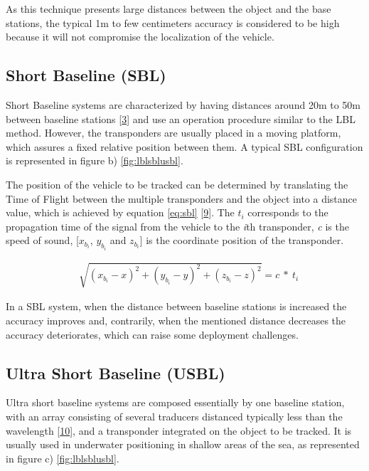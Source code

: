 As this technique presents large distances between the object and the base stations, the typical 1m to few centimeters accuracy is considered to be high because it will not compromise the localization of the vehicle. 


\subsection{Short Baseline (SBL)}

Short Baseline systems are characterized by having distances around 20m to 50m between baseline stations [\hyperref[r:survey-tech-chall]{3}] and use an operation procedure similar to the LBL method. However, the transponders are usually placed in a moving platform, which assures a fixed relative position between them. A typical SBL configuration is represented in figure b) \ref{fig:lblsblusbl}.

The position of the vehicle to be tracked can be determined by translating the Time of Flight between the multiple transponders and the object into a distance value, which is achieved by equation \ref{eq:sbl} [\hyperref[r:sbl]{9}]. The $t_{i}$ corresponds to the propagation time of the signal from the vehicle to the \textit{i}th transponder, \textit{c} is the speed of sound, [$x_{b_{i}}$, $y_{b_{i}}$ and $z_{b_{i}}$] is the coordinate position of the transponder.

\begin{eqnarray}
&\sqrt{ (x_{b_{i}}-x)^2 + (y_{b_{i}}-y)^2 + (z_{b_{i}}-z)^2 } = c\ *\ t_{i}
\label{eq:sbl}
\end{eqnarray}

In a SBL system, when the distance between baseline stations is increased the accuracy improves and, contrarily, when the mentioned distance decreases the accuracy deteriorates, which can raise some deployment challenges.

\subsection{Ultra Short Baseline (USBL)}

Ultra short baseline systems are composed essentially by one baseline station, with an array consisting of several traducers distanced typically less than the wavelength [\hyperref[r:lblsblusbl]{10}], and a transponder integrated on the object to be tracked. It is usually used in underwater positioning in shallow areas of the sea, as represented in figure c) \ref{fig:lblsblusbl}.


